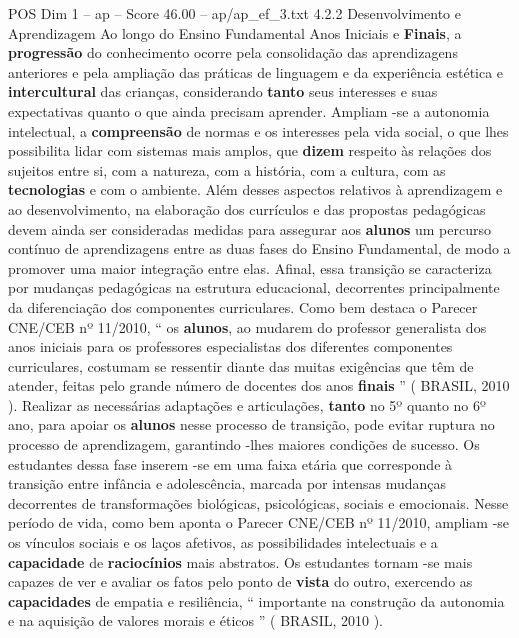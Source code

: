 \begin{textsample}{POS Dim 1 – ap – Score 46.00 – ap/ap\_ef\_3.txt}  \label{ex:f1_pos_166}
4.2.2 Desenvolvimento e Aprendizagem Ao longo do Ensino Fundamental Anos Iniciais e \textbf{Finais}, a \textbf{progressão} do conhecimento ocorre pela consolidação das aprendizagens anteriores e pela ampliação das práticas de linguagem e da experiência estética e \textbf{intercultural} das crianças, considerando \textbf{tanto} seus interesses e suas expectativas quanto o que ainda precisam aprender.
Ampliam -se a autonomia intelectual, a \textbf{compreensão} de normas e os interesses pela vida social, o que lhes possibilita lidar com sistemas mais amplos, que \textbf{dizem} respeito às relações dos sujeitos entre si, com a natureza, com a história, com a cultura, com as \textbf{tecnologias} e com o ambiente.
Além desses aspectos relativos à aprendizagem e ao desenvolvimento, na elaboração dos currículos e das propostas pedagógicas devem ainda ser consideradas medidas para assegurar aos \textbf{alunos} um percurso contínuo de aprendizagens entre as duas fases do Ensino Fundamental, de modo a promover uma maior integração entre elas.
Afinal, essa transição se caracteriza por mudanças pedagógicas na estrutura educacional, decorrentes principalmente da diferenciação dos componentes curriculares.
Como bem destaca o Parecer CNE/CEB nº 11/2010, “ os \textbf{alunos}, ao mudarem do professor generalista dos anos iniciais para os professores especialistas dos diferentes componentes curriculares, costumam se ressentir diante das muitas exigências que têm de atender, feitas pelo grande número de docentes dos anos \textbf{finais} ” ( BRASIL, 2010 ).
Realizar as necessárias adaptações e articulações, \textbf{tanto} no 5º quanto no 6º ano, para apoiar os \textbf{alunos} nesse processo de transição, pode evitar ruptura no processo de aprendizagem, garantindo -lhes maiores condições de sucesso.
Os estudantes dessa fase inserem -se em uma faixa etária que corresponde à transição entre infância e adolescência, marcada por intensas mudanças decorrentes de transformações biológicas, psicológicas, sociais e emocionais.
Nesse período de vida, como bem aponta o Parecer CNE/CEB nº 11/2010, ampliam -se os vínculos sociais e os laços afetivos, as possibilidades intelectuais e a \textbf{capacidade} de \textbf{raciocínios} mais abstratos.
Os estudantes tornam -se mais capazes de ver e avaliar os fatos pelo ponto de \textbf{vista} do outro, exercendo as \textbf{capacidades} de empatia e resiliência, “ importante na construção da autonomia e na aquisição de valores morais e éticos ” ( BRASIL, 2010 ).

\end{textsample}

